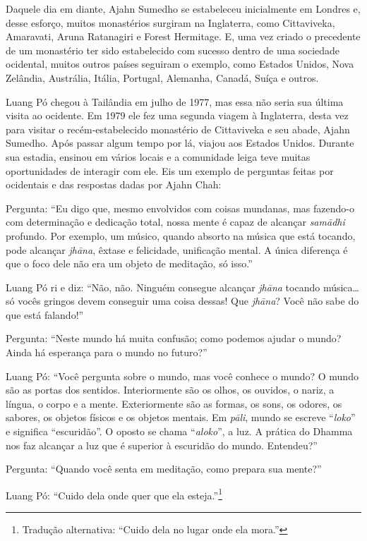 Daquele dia em diante, Ajahn Sumedho se estabeleceu inicialmente em
Londres e, desse esforço, muitos monastérios surgiram na Inglaterra,
como Cittaviveka, Amaravati, Aruna Ratanagiri e Forest Hermitage. E, uma
vez criado o precedente de um monastério ter sido estabelecido com
sucesso dentro de uma sociedade ocidental, muitos outros países seguiram
o exemplo, como Estados Unidos, Nova Zelândia, Austrália, Itália,
Portugal, Alemanha, Canadá, Suíça e outros.

Luang Pó chegou à Tailândia em julho de 1977, mas essa não seria sua
última visita ao ocidente. Em 1979 ele fez uma segunda viagem à
Inglaterra, desta vez para visitar o recém-estabelecido monastério de
Cittaviveka e seu abade, Ajahn Sumedho. Após passar algum tempo por lá,
viajou aos Estados Unidos. Durante sua estadia, ensinou em vários locais
e a comunidade leiga teve muitas oportunidades de interagir com ele. Eis
um exemplo de perguntas feitas por ocidentais e das respostas dadas por
Ajahn Chah:

Pergunta: ``Eu digo que, mesmo envolvidos com coisas mundanas, mas
fazendo-o com determinação e dedicação total, nossa mente é capaz de
alcançar \emph{samādhi} profundo. Por exemplo, um músico, quando absorto
na música que está tocando, pode alcançar \emph{jhāna}, êxtase e
felicidade, unificação mental. A única diferença é que o foco dele não
era um objeto de meditação, só isso.''

Luang Pó ri e diz: ``Não, não. Ninguém consegue alcançar \emph{jhāna}
tocando música\ldots{} só vocês gringos devem conseguir uma coisa
dessas! Que \emph{jhāna}? Você não sabe do que está falando!''

Pergunta: ``Neste mundo há muita confusão; como podemos ajudar o mundo?
Ainda há esperança para o mundo no futuro?''

Luang Pó: ``Você pergunta sobre o mundo, mas você conhece o mundo? O
mundo são as portas dos sentidos. Interiormente são os olhos, os
ouvidos, o nariz, a língua, o corpo e a mente. Exteriormente são as
formas, os sons, os odores, os sabores, os objetos físicos e os objetos
mentais. Em \emph{pāli}, mundo se escreve ``\emph{loko}'' e significa
``escuridão''. O oposto se chama ``\emph{aloko}'', a luz. A prática do
Dhamma nos faz alcançar a luz que é superior à escuridão do mundo.
Entendeu?''

Pergunta: ``Quando você senta em meditação, como prepara sua mente?''

Luang Pó: ``Cuido dela onde quer que ela esteja.''\footnote{Tradução
  alternativa: ``Cuido dela no lugar onde ela mora.''}

